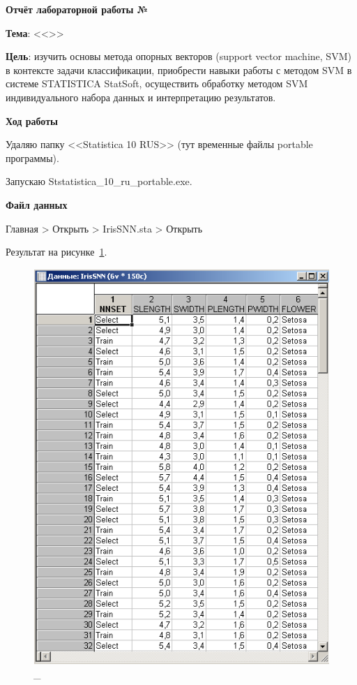 \begin{center}
  \textbf{Отчёт лабораторной работы №\envReportLabNumber}
\end{center}

\textbf{Тема}:
<<\envReportTitle>>

\textbf{Цель}:
изучить основы метода опорных векторов (support vector machine, SVM) в
контексте задачи классификации, приобрести навыки работы с методом SVM в
системе STATISTICA StatSoft, осуществить обработку методом SVM
индивидуального набора данных и интерпретацию результатов.

\begin{center}
  \textbf{Ход работы}
\end{center}

Удаляю папку <<Statistica 10 RUS>> (тут временные файлы portable программы).

Запускаю Ststatistica\_10\_ru\_portable.exe.

\begin{center}
  \textbf{Файл данных}
\end{center}

Главная > Открыть > IrisSNN.sta > Открыть

Результат на рисунке~\ref{fig:1}.

\begin{figure}[!h]
  \centering

  \includegraphics[height=15cm]
  {inc/ex_1.PNG}

  \caption{\_}

  \label{fig:1}
\end{figure}


